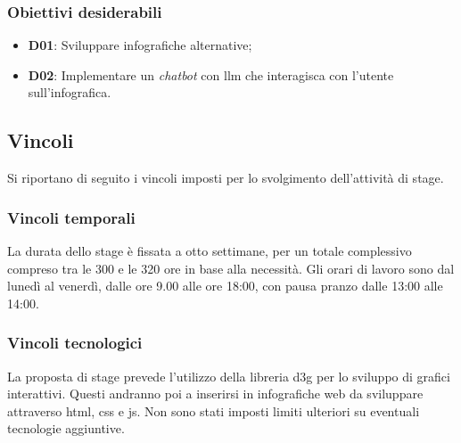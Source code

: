 \subsubsection{Obiettivi desiderabili}
\begin{itemize}
    \item \textbf{D01}: Sviluppare infografiche alternative;
    \item \textbf{D02}: Implementare un \emph{chatbot} con \gls{llm} che interagisca con l'utente sull'infografica.
\end{itemize}


\subsection{Vincoli}
Si riportano di seguito i vincoli imposti per lo svolgimento dell'attività di stage.

\subsubsection{Vincoli temporali}
La durata dello stage è fissata a otto settimane, per un totale complessivo compreso tra le 300 e le 320 ore in base alla necessità.
Gli orari di lavoro sono dal lunedì al venerdì, dalle ore 9.00 alle ore 18:00, con pausa pranzo dalle 13:00 alle 14:00.

\subsubsection{Vincoli tecnologici}
La proposta di stage prevede l'utilizzo della libreria \gls{d3g} per lo sviluppo
di grafici interattivi. Questi andranno poi a inserirsi in infografiche web da 
sviluppare attraverso \gls{html}, \gls{css} e \gls{js}.
Non sono stati imposti limiti ulteriori su eventuali tecnologie aggiuntive.



